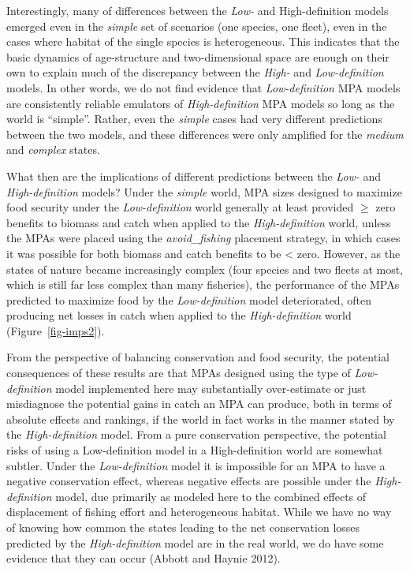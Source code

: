 \documentclass[
  default,
  lineno,
  referee]{sn-jnl}
\begin{document}
Interestingly, many of differences between the \emph{Low-} and
High-definition models emerged even in the \emph{simple} set of
scenarios (one species, one fleet), even in the cases where habitat of
the single species is heterogeneous. This indicates that the basic
dynamics of age-structure and two-dimensional space are enough on their
own to explain much of the discrepancy between the \emph{High-} and
\emph{Low-definition} models. In other words, we do not find evidence
that \emph{Low-definition} MPA models are consistently reliable
emulators of \emph{High-definition} MPA models so long as the world is
``simple''. Rather, even the \emph{simple} cases had very different
predictions between the two models, and these differences were only
amplified for the \emph{medium} and \emph{complex} states.

What then are the implications of different predictions between the
\emph{Low-} and \emph{High-definition} models? Under the \emph{simple}
world, MPA sizes designed to maximize food security under the
\emph{Low-definition} world generally at least provided \(\geq\) zero
benefits to biomass and catch when applied to the \emph{High-definition}
world, unless the MPAs were placed using the \emph{avoid\_fishing}
placement strategy, in which cases it was possible for both biomass and
catch benefits to be \textless{} zero. However, as the states of nature
became increasingly complex (four species and two fleets at most, which
is still far less complex than many fisheries), the performance of the
MPAs predicted to maximize food by the \emph{Low-definition} model
deteriorated, often producing net losses in catch when applied to the
\emph{High-definition} world (Figure~\ref{fig-imps2}).

From the perspective of balancing conservation and food security, the
potential consequences of these results are that MPAs designed using the
type of \emph{Low-definition} model implemented here may substantially
over-estimate or just misdiagnose the potential gains in catch an MPA
can produce, both in terms of absolute effects and rankings, if the
world in fact works in the manner stated by the \emph{High-definition}
model. From a pure conservation perspective, the potential risks of
using a Low-definition model in a High-definition world are somewhat
subtler. Under the \emph{Low-definition} model it is impossible for an
MPA to have a negative conservation effect, whereas negative effects are
possible under the \emph{High-definition} model, due primarily as
modeled here to the combined effects of displacement of fishing effort
and heterogeneous habitat. While we have no way of knowing how common
the states leading to the net conservation losses predicted by the
\emph{High-definition} model are in the real world, we do have some
evidence that they can occur (Abbott and Haynie 2012).
\end{document}
